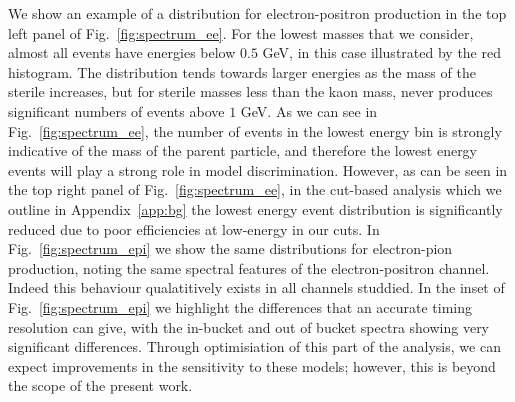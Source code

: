 \documentclass[11pt, a4paper]{article}
\newcommand{\reffig}[1]{Fig.~\ref{#1}}
\newcommand{\refapp}[1]{Appendix~\ref{#1}}
\def\muboone{MicroBooNE}
\def\ster{\ensuremath N}
\begin{document}
We show an example of a distribution for electron-positron production in the
top left panel of \reffig{fig:spectrum_ee}. For the lowest masses that we consider, almost all events have
energies below $0.5$ GeV, in this case illustrated by the red histogram. The
distribution tends towards larger energies as the mass of the sterile
increases, but for sterile masses less than the kaon mass, never produces
significant numbers of events above $1$ GeV. As we can see in
\reffig{fig:spectrum_ee}, the number of events in the lowest energy bin is
strongly indicative of the mass of the parent particle, and therefore the
lowest energy events will play a strong role in model discrimination. However,
as can be seen in the top right panel of \reffig{fig:spectrum_ee}, in the
cut-based analysis which we outline in \refapp{app:bg} the lowest energy event
distribution is significantly reduced due to poor efficiencies at low-energy in
our cuts. In \reffig{fig:spectrum_epi} we show the same
distributions for electron-pion production, noting the same spectral features
of the electron-positron channel. Indeed this behaviour qualatitively exists in all channels studdied. In the inset of \reffig{fig:spectrum_epi} we highlight the differences
that an accurate timing resolution can give, with the in-bucket and out of bucket
spectra showing very significant differences.  Through optimisiation of this part of
the analysis, we can expect improvements in the sensitivity to these models;
however, this is beyond the scope of the present work.  



%
\end{document}
